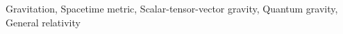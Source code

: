 \documentclass[twocolumn]{aastex631}
\begin{document}
Gravitation, Spacetime metric, Scalar-tensor-vector gravity, Quantum gravity, General relativity
\end{document}
